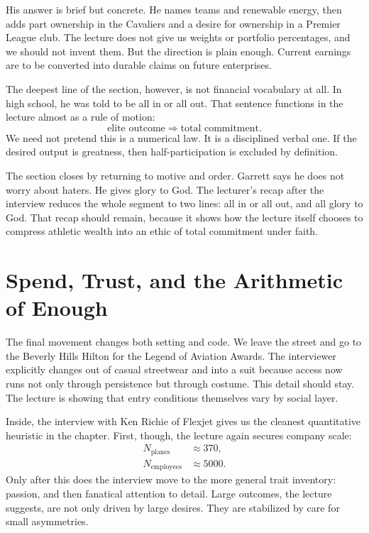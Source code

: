 His answer is brief but concrete. He names teams and renewable energy, then adds part ownership in the Cavaliers and a desire for ownership in a Premier League club. The lecture does not give us weights or portfolio percentages, and we should not invent them. But the direction is plain enough. Current earnings are to be converted into durable claims on future enterprises.

The deepest line of the section, however, is not financial vocabulary at all. In high school, he was told to be all in or all out. That sentence functions in the lecture almost as a rule of motion:
\begin{equation}
\text{elite outcome} \Longrightarrow \text{total commitment}.
\end{equation}
We need not pretend this is a numerical law. It is a disciplined verbal one. If the desired output is greatness, then half-participation is excluded by definition.

The section closes by returning to motive and order. Garrett says he does not worry about haters. He gives glory to God. The lecturer's recap after the interview reduces the whole segment to two lines: all in or all out, and all glory to God. That recap should remain, because it shows how the lecture itself chooses to compress athletic wealth into an ethic of total commitment under faith.

\section{Spend, Trust, and the Arithmetic of Enough}

The final movement changes both setting and code. We leave the street and go to the Beverly Hills Hilton for the Legend of Aviation Awards. The interviewer explicitly changes out of casual streetwear and into a suit because access now runs not only through persistence but through costume. This detail should stay. The lecture is showing that entry conditions themselves vary by social layer.

Inside, the interview with Ken Richie of Flexjet gives us the cleanest quantitative heuristic in the chapter. First, though, the lecture again secures company scale:
\begin{align}
N_{\text{planes}} &\approx 370,\\
N_{\text{employees}} &\approx 5000.
\end{align}
Only after this does the interview move to the more general trait inventory: passion, and then fanatical attention to detail. Large outcomes, the lecture suggests, are not only driven by large desires. They are stabilized by care for small asymmetries.

